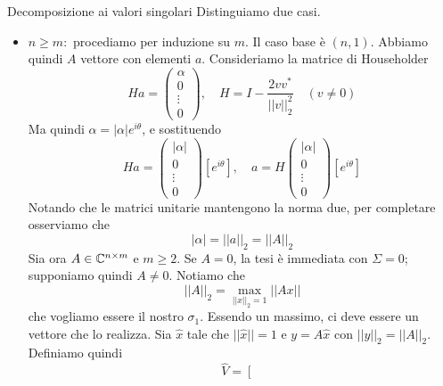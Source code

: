 \documentclass[a4paper]{article}
\begin{document}
\begin{snippetproof}{Decomposizione ai valori singolari}
    Distinguiamo due casi.
    \begin{itemize}
        \item \(n \geq m:\)
            procediamo per induzione su \(m\). Il caso base è
            \((n, 1)\). Abbiamo quindi \(A\) vettore con elementi \(a\).
            Consideriamo la matrice di Householder \[
                Ha =
                \begin{pmatrix}
                    \alpha \\ 0 \\ \vdots \\ 0
                \end{pmatrix},
                \quad H = I - \frac{2vv^*}{||v||_2^2}\quad(v\neq 0)
            \]
            Ma quindi \(\alpha = |\alpha| e^{i\theta}\),
            e sostituendo
            \[
                Ha =
                \begin{pmatrix}
                    |\alpha| \\ 0 \\ \vdots \\ 0
                \end{pmatrix}\left[
                    e^{i\theta}
                \right],
                \quad a = H
                \begin{pmatrix}
                    |\alpha| \\ 0 \\ \vdots \\ 0
                \end{pmatrix}
                \left[e^{i\theta}\right]
            \]
            Notando che le matrici unitarie mantengono la norma due,
            per completare osserviamo che
            \[
                |\alpha| = ||a||_2 = ||A||_2
            \]
            Sia ora \(A \in \mathbb{C}^{n \times m}\)
            e \(m \geq 2\). Se \(A=0\), la tesi è immediata con \(\Sigma=0\); supponiamo quindi \(A\neq 0\).
            Notiamo che
            \[
                ||A||_2 = \max_{||x||_2 = 1} ||Ax||
            \]
            che vogliamo essere il nostro \(\sigma_1\).
            Essendo un massimo, ci deve essere un vettore che lo realizza.
            Sia \(\hat x\) tale che \(||\hat x|| = 1\) e
            \(y = A\hat x\) con \(||y||_2 = ||A||_2\).
            Definiamo quindi
            \[
                \hat V =
                \left[
                    \begin{array}{c|c|c|c}

\end{array}\]
\end{itemize}
\end{snippetproof}
\end{document}
